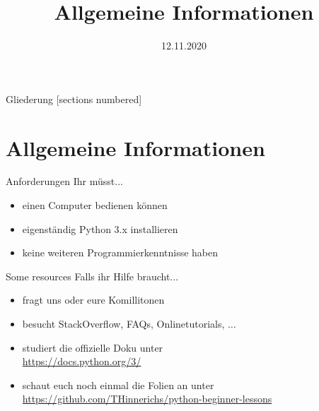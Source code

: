 



\title{Allgemeine Informationen}
\date{12.11.2020}


	
\maketitle

\begin{frame}{Gliederung}
	[sections numbered]
	\tableofcontents
\end{frame}

\section{Allgemeine Informationen}
\begin{frame}{Anforderungen}
	Ihr müsst...
	\begin{itemize}
		\item einen Computer bedienen können
		\item eigenständig Python 3.x installieren
		\item keine weiteren Programmierkenntnisse haben
	\end{itemize}
\end{frame}

\begin{frame}{Some resources}
	Falls ihr Hilfe braucht...
	\begin{itemize}
		\item fragt uns oder eure Komillitonen
		\item besucht StackOverflow, FAQs, Onlinetutorials, $\dots$
		\item studiert die offizielle Doku unter \hfill \\
			\url{https://docs.python.org/3/}
		\item schaut euch noch einmal die Folien an unter \hfill \\
			\url{https://github.com/THinnerichs/python-beginner-lessons}
	\end{itemize}
\end{frame}

